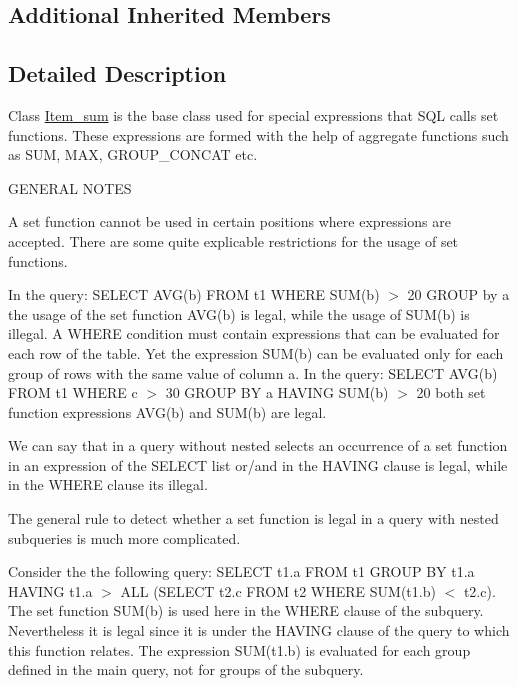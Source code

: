 \subsection*{Additional Inherited Members}


\subsection{Detailed Description}
Class \mbox{\hyperlink{classItem__sum}{Item\+\_\+sum}} is the base class used for special expressions that S\+QL calls \textquotesingle{}set functions\textquotesingle{}. These expressions are formed with the help of aggregate functions such as S\+UM, M\+AX, G\+R\+O\+U\+P\+\_\+\+C\+O\+N\+C\+AT etc.

G\+E\+N\+E\+R\+AL N\+O\+T\+ES

A set function cannot be used in certain positions where expressions are accepted. There are some quite explicable restrictions for the usage of set functions.

In the query\+: S\+E\+L\+E\+CT A\+V\+G(b) F\+R\+OM t1 W\+H\+E\+RE S\+U\+M(b) $>$ 20 G\+R\+O\+UP by a the usage of the set function A\+V\+G(b) is legal, while the usage of S\+U\+M(b) is illegal. A W\+H\+E\+RE condition must contain expressions that can be evaluated for each row of the table. Yet the expression S\+U\+M(b) can be evaluated only for each group of rows with the same value of column a. In the query\+: S\+E\+L\+E\+CT A\+V\+G(b) F\+R\+OM t1 W\+H\+E\+RE c $>$ 30 G\+R\+O\+UP BY a H\+A\+V\+I\+NG S\+U\+M(b) $>$ 20 both set function expressions A\+V\+G(b) and S\+U\+M(b) are legal.

We can say that in a query without nested selects an occurrence of a set function in an expression of the S\+E\+L\+E\+CT list or/and in the H\+A\+V\+I\+NG clause is legal, while in the W\+H\+E\+RE clause it\textquotesingle{}s illegal.

The general rule to detect whether a set function is legal in a query with nested subqueries is much more complicated.

Consider the the following query\+: S\+E\+L\+E\+CT t1.\+a F\+R\+OM t1 G\+R\+O\+UP BY t1.\+a H\+A\+V\+I\+NG t1.\+a $>$ A\+LL (S\+E\+L\+E\+CT t2.\+c F\+R\+OM t2 W\+H\+E\+RE S\+UM(t1.\+b) $<$ t2.\+c). The set function S\+U\+M(b) is used here in the W\+H\+E\+RE clause of the subquery. Nevertheless it is legal since it is under the H\+A\+V\+I\+NG clause of the query to which this function relates. The expression S\+UM(t1.\+b) is evaluated for each group defined in the main query, not for groups of the subquery.

